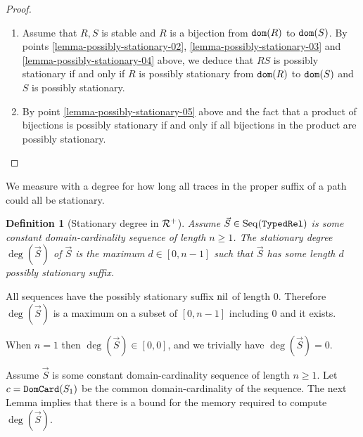 \documentclass{lmcs}
\newtheorem{definition}[theorem]{Definition}
\begin{document}
\begin{proof}
\begin{enumerate}
\item
Assume that $R,S$ is stable and $R$ is a bijection from ${\tt dom}(R)$ to ${\tt dom}(S)$.
By points  \ref{lemma-possibly-stationary-02}, \ref{lemma-possibly-stationary-03} 
and \ref{lemma-possibly-stationary-04} above, we deduce that
$RS$ is possibly stationary if and only if $R$ is possibly stationary from ${\tt dom}(R)$ to 
${\tt dom}(S)$ and $S$ is possibly stationary.

\item
By point \ref{lemma-possibly-stationary-05} above and the fact that a product of
bijections is possibly stationary if and only if all bijections in the product are possibly stationary.
\end{enumerate}
\end{proof}

We measure with a degree for how long all traces in the proper suffix  of a path 
could all be stationary.

\begin{definition}[Stationary degree in ${\mathcal R}^+$]
Assume $\vec{S} \in {\rm Seq}({\tt TypedRel})$ is some constant domain-cardinality sequence
of length $n \ge 1$. The stationary degree $\deg(\vec{S})$ of $\vec{S}$ is the maximum 
$d \in [0, n-1]$ such that $\vec{S}$ has some length $d$ possibly stationary suffix.
\end{definition}

All sequences have the possibly stationary suffix ${{\rm nil}}$ of length $0$.
Therefore $\deg(\vec{S})$ is a maximum on a subset of $[0,n-1]$ including $0$
and it exists. 

When $n=1$ then $\deg(\vec{S}) \in [0,0]$, and we trivially have $\deg(\vec{S})=0$.

Assume $\vec{S}$ is some constant domain-cardinality sequence of length $n \ge 1$. 
Let $c = {\tt DomCard}(S_1)$ be the common domain-cardinality of the sequence.
The next Lemma implies that there is a bound for the memory required to compute 
$\deg(\vec{S})$.
\end{document}
